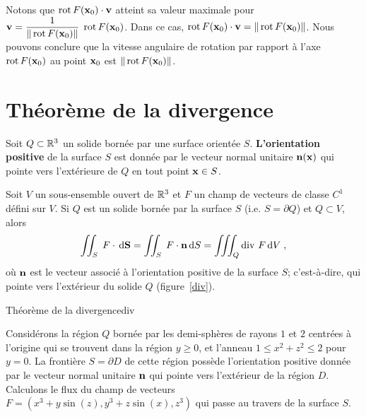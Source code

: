 {Notons que $\operatorname{rot} F(\mathbf{x}_0) \cdot \mathbf{v}$ atteint sa valeur
maximale pour
$\displaystyle \mathbf{v} = \frac{1}{\|\operatorname{rot} F(\mathbf{x}_0)\|}\; \operatorname{rot} F(\mathbf{x}_0)$.
Dans ce cas,
$\operatorname{rot} F(\mathbf{x}_0) \cdot \mathbf{v} = \|\operatorname{rot} F(\mathbf{x}_0)\|$.
Nous pouvons conclure que la vitesse angulaire de rotation par rapport à
l'axe $\operatorname{rot} F(\mathbf{x}_0)$ au point $\mathbf{x}_0$ est
$\|\operatorname{rot} F(\mathbf{x}_0)\|$.

\section{Théorème de la divergence}

Soit $Q \subset \mathbb{R}^3$ un solide bornée par une surface orientée $S$.
{\bfseries L'orientation positive} de la surface $S$ est donnée par le
vecteur normal unitaire $\mathbf{n}(\mathbf{x})$ qui pointe vers l'extérieure
de $Q$ en tout point $\mathbf{x} \in S$.

\begin{theorem}
Soit $V$ un sous-ensemble ouvert de $\mathbb{R}^3$ et $F$ un champ de
vecteurs de classe $C^1$ défini sur $V$.  Si $Q$ est un solide bornée
par la surface $S$ (i.e. $S = \partial Q$) et $Q \subset V$, alors
\[
\iint_S\;F\cdot \,\mathrm{d}\mathbf{S}
= \iint_S\;F\cdot \mathbf{n} \,\mathrm{d}S = \iiint_Q \operatorname{div}\,F \,\mathrm{d}V \; ,
\]
où $\mathbf{n}$ est le vecteur associé à l'orientation positive de la surface
$S$; c'est-à-dire, qui pointe vers l'extérieur du solide $Q$
(figure~\ref{div}).
\end{theorem}

{Théorème de la divergence}{div}

\begin{egg}
Considérons la région $Q$ bornée par les demi-sphères de rayons
$1$ et $2$ centrées à l'origine qui se trouvent dans la région
$y \geq 0$, et l'anneau $1\leq x^2 + z^2 \leq 2$ pour $y=0$.
La frontière $S = \partial D$ de cette région possède l'orientation
positive donnée par le vecteur normal unitaire $\mathbf{n}$ qui pointe
vers l'extérieur de la région $D$.  Calculons le flux du champ
de vecteurs $F = (x^3 + y\sin(z) , y^3 + z \sin(x), z^3)$ qui
passe au travers de la surface $S$.


\end{egg}}
